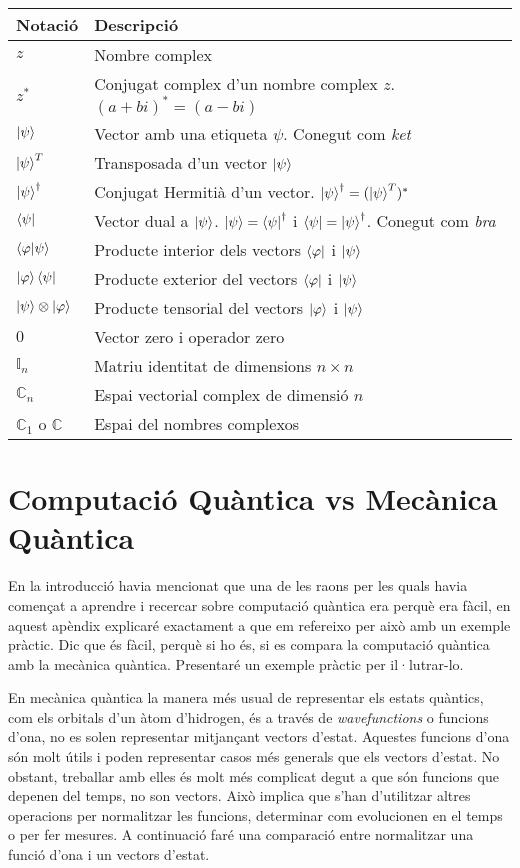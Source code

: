 \begin{tabular}{ p{2cm}|p{12cm} }
	\hline
	Notació & Descripció\\
	\hline
	\hline
	$z$ & Nombre complex    \\
	$z^{*}$ & Conjugat complex d'un nombre complex $z$. $(a+ bi)^{*} = (a -bi)$\\
	$\ket{\psi} $ & Vector amb una etiqueta $\psi$. Conegut com \textit{ket}\\
	$\ket{\psi}^T$ & Transposada d'un vector $\ket{\psi}$ \\
	$\ket{\psi}^\dag $ &  Conjugat Hermitià d'un vector. $\ket{\psi}^\dag = (\ket{\psi}^T)^* $\\
	$\bra{\psi} $ & Vector dual a $\ket{\psi}$. $ \ket{\psi} = \bra{\psi}^{\dag}$ i $\bra{\psi} = \ket{\psi}^\dag$. Conegut com \textit{bra}\\
	$ \bra{\varphi}\ket{\psi} $ & Producte interior dels vectors $\bra{\varphi}$ i $\ket{\psi}$ \\
	$ \ket{\varphi}\bra{\psi} $ & Producte exterior del vectors $\bra{\varphi}$ i $\ket{\psi}$ \\
	$ \ket{\psi}\otimes\ket{\varphi}$ & Producte tensorial del vectors $\ket{\varphi}$ i $\ket{\psi}$ \\
	$ 0 $ & Vector zero i operador zero \\
	$ \mathbb{I}_n $ & Matriu identitat de dimensions $n\times n$ \\
	$ \mathbb{C}_n $ & Espai vectorial complex de dimensió $n$ \\
	$ \mathbb{C}_1$ o $\mathbb{C} $ & Espai del nombres complexos \\
	
\end{tabular}




\chapter{Computació Quàntica vs Mecànica Quàntica}
En la introducció havia mencionat que una de les raons per les quals havia començat a aprendre i recercar sobre computació quàntica era perquè era fàcil, en aquest apèndix explicaré exactament a que em refereixo per això amb un exemple pràctic. Dic que és fàcil, perquè si ho és, si es compara la computació quàntica amb la mecànica quàntica. Presentaré un exemple pràctic per il·lutrar-lo.  

En mecànica quàntica la manera més usual de representar els estats quàntics, com els orbitals d'un àtom d'hidrogen, és a través de \textit{wavefunctions} o funcions d'ona, no es solen representar mitjançant vectors d'estat. Aquestes funcions d'ona són molt útils i poden representar casos més generals que els vectors d'estat. No obstant, treballar amb elles és molt més complicat degut a que són funcions que depenen del temps, no son vectors. Això implica que s'han d'utilitzar altres operacions per normalitzar les funcions, determinar com evolucionen en el temps o per fer mesures. A continuació faré una comparació entre normalitzar una funció d'ona i un vectors d'estat.

